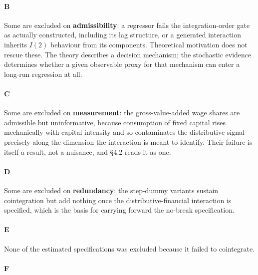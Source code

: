 \paragraph{B}
Some are excluded on \textbf{admissibility}: a regressor fails the integration-order gate as actually constructed, including its lag structure, or a generated interaction inherits $I(2)$ behaviour from its components. Theoretical motivation does not rescue these. The theory describes a decision mechanism; the stochastic evidence determines whether a given observable proxy for that mechanism can enter a long-run regression at all.

\paragraph{C}
Some are excluded on \textbf{measurement}: the gross-value-added wage shares are admissible but uninformative, because consumption of fixed capital rises mechanically with capital intensity and so contaminates the distributive signal precisely along the dimension the interaction is meant to identify. Their failure is itself a result, not a nuisance, and §4.2 reads it as one.

\paragraph{D}
Some are excluded on \textbf{redundancy}: the step-dummy variants sustain cointegration but add nothing once the distributive-financial interaction is specified, which is the basis for carrying forward the no-break specification.

\paragraph{E}
None of the estimated specifications was excluded because it failed to cointegrate.

\paragraph{F}

